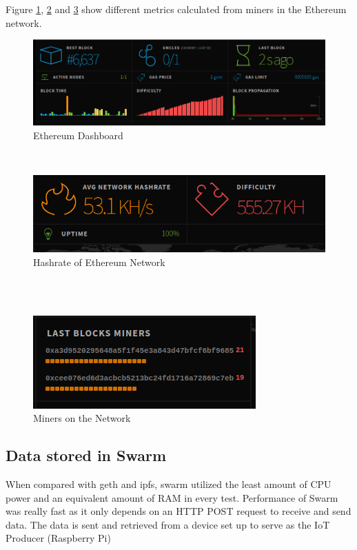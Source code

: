 \documentclass[11pt,openright]{report}
\begin{document}
Figure \ref{fig:eth_dashboard}, \ref{fig:eth_hashrate} and \ref{fig:eth_miners} show different metrics calculated from miners in the Ethereum network.
\newline
\newline
\begin{figure}[!htbp]
    \centering
    \includegraphics[scale=0.8]{results/Dashboard.png}
    \caption{Ethereum Dashboard}
    \label{fig:eth_dashboard}
\end{figure}
\newpage
\hfill\\
\begin{figure}[!htbp]
    \centering
    \includegraphics[scale=1]{results/hashrate.png}
    \caption{Hashrate of Ethereum Network}
    \label{fig:eth_hashrate}
\end{figure}
\hfill\\
\hfill\\
\begin{figure}[!htbp]
    \centering
    \includegraphics[scale=1]{results/miners.png}
    \caption{Miners on the Network}
    \label{fig:eth_miners}
\end{figure}
\newline
\newline
\subsection{Data stored in Swarm}
When compared with geth and ipfs, swarm utilized the least amount of CPU power and an equivalent amount of RAM in every test. Performance of Swarm was really fast as it only depends on an HTTP POST request to receive and send data. The data is sent and retrieved from a device set up to serve as the IoT Producer (Raspberry Pi)
\end{document}
